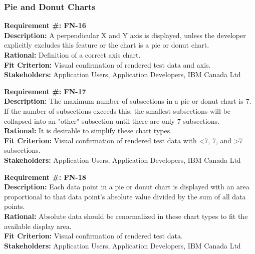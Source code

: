 \documentclass[12pt, titlepage]{article}
\begin{document}
\subsubsection{Pie and Donut Charts}
\begin{flushleft}
\textbf{Requirement \#: FN-16} \\
\textbf{Description:} A perpendicular X and Y axis is displayed, unless the developer explicitly excludes this feature or the chart is a pie or donut chart. \\
\textbf{Rational:} Definition of a correct axis chart. \\
\textbf{Fit Criterion:} Visual confirmation of rendered test data and axis. \\
\textbf{Stakeholders:} Application Users, Application Developers, IBM Canada Ltd\\
\end{flushleft}
\begin{flushleft}
\textbf{Requirement \#: FN-17} \\
\textbf{Description:} The maximum number of subsections in a pie or donut chart is 7. If the number of subsections exceeds this, the smallest subsections will be collapsed into an "other" subsection until there are only 7 subsections. \\
\textbf{Rational:} It is desirable to simplify these chart types. \\
\textbf{Fit Criterion:} Visual confirmation of rendered test data with <7, 7, and >7 subsections. \\
\textbf{Stakeholders:} Application Users, Application Developers, IBM Canada Ltd\\
\end{flushleft}
\begin{flushleft}
\textbf{Requirement \#: FN-18} \\
\textbf{Description:} Each data point in a pie or donut chart is displayed with an area proportional to that data point's absolute value divided by the sum of all data points. \\
\textbf{Rational:} Absolute data should be renormalized in these chart types to fit the available display area. \\
\textbf{Fit Criterion:} Visual confirmation of rendered test data. \\
\textbf{Stakeholders:} Application Users, Application Developers, IBM Canada Ltd\\
\end{flushleft}
\end{document}
